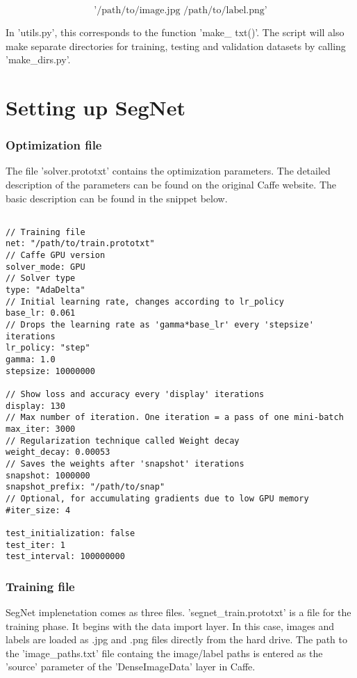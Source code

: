 $$
\text{'/path/to/image.jpg /path/to/label.png'}
$$

In 'utils.py', this corresponds to the function 'make\_ txt()'. The script will also make separate directories for training, testing and validation datasets by calling 'make\_dirs.py'.

\section{Setting up SegNet}

\subsubsection{Optimization file}

The file 'solver.prototxt' contains the optimization parameters. The detailed description of the parameters can be found on the original Caffe website. The basic description can be found in the snippet below. 

\begin{lstlisting}

// Training file
net: "/path/to/train.prototxt"	
// Caffe GPU version
solver_mode: GPU
// Solver type		
type: "AdaDelta"
// Initial learning rate, changes according to lr_policy		
base_lr: 0.061		
// Drops the learning rate as 'gamma*base_lr' every 'stepsize' iterations
lr_policy: "step"		 	
gamma: 1.0
stepsize: 10000000

// Show loss and accuracy every 'display' iterations
display: 130
// Max number of iteration. One iteration = a pass of one mini-batch			
max_iter: 3000	
// Regularization technique called Weight decay		
weight_decay: 0.00053	
// Saves the weights after 'snapshot' iterations
snapshot: 1000000		
snapshot_prefix: "/path/to/snap" 
// Optional, for accumulating gradients due to low GPU memory 
#iter_size: 4			

test_initialization: false	
test_iter: 1
test_interval: 100000000

\end{lstlisting}

\subsubsection{Training file}

SegNet implenetation comes as three files. 'segnet\_train.prototxt' is a file for the training phase. It begins with the data import layer. In this case, images and labels are loaded as .jpg and .png files directly from the hard drive. The path to the 'image\_paths.txt' file containg the image/label paths is entered as the 'source' parameter of the 'DenseImageData' layer in Caffe.

